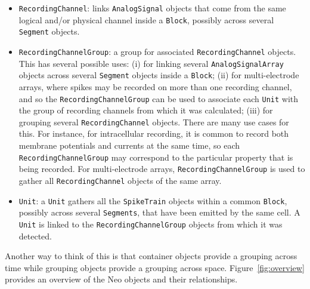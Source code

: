 \documentclass{frontiers}
\begin{document}
\begin{itemize}
\item \lstinline`RecordingChannel`: links \lstinline`AnalogSignal` objects that come from the same logical and/or physical channel inside a \lstinline`Block`, possibly across several \lstinline`Segment` objects.
\item \lstinline`RecordingChannelGroup`: a group for associated \lstinline`RecordingChannel` objects. This has several possible uses: 
(i) for linking several \lstinline`AnalogSignalArray` objects across several \lstinline`Segment` objects inside a \lstinline`Block`;
(ii) for multi-electrode arrays, where spikes may be recorded on more than one recording channel, and so the \lstinline`RecordingChannelGroup` can be used to associate each \lstinline`Unit` with the group of recording channels from which it was calculated;
(iii) for grouping several \lstinline`RecordingChannel` objects. There are many use cases for this. For instance, for intracellular recording, it is common to record both membrane potentials and currents at the same time, so each \lstinline`RecordingChannelGroup` may correspond to the particular property that is being recorded. For multi-electrode arrays, \lstinline`RecordingChannelGroup` is used to gather all \lstinline`RecordingChannel` objects of the same array.
\item \lstinline`Unit`: a \lstinline`Unit` gathers all the \lstinline`SpikeTrain` objects within a common \lstinline`Block`, possibly across several \lstinline`Segments`, that have been emitted by the same cell. A \lstinline`Unit` is linked to the \lstinline`RecordingChannelGroup` objects from which it was detected.
\end{itemize}

Another way to think of this is that container objects provide a grouping across time while grouping objects provide a grouping across space.
Figure~\ref{fig:overview} provides an overview of the Neo objects and their relationships.
\end{document}

